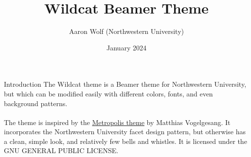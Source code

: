 \documentclass[aspectratio=1610]{beamer}
\title{Wildcat Beamer Theme}
\date{January 2024}
\author{Aaron Wolf (Northwestern University)}
\begin{document}
\begin{frame}
\titlepage
\end{frame}


\begin{frame}{Introduction}
    The Wildcat theme is a Beamer theme for Northwestern University, but which can be modified easily with different colors, fonts, and even background patterns. 
    \\ ~ \\
    The theme is inspired by the \href{https://github.com/matze/mtheme}{Metropolis theme} by Matthias Vogelgesang. It incorporates the Northwestern University facet design pattern, but otherwise has a clean, simple look, and relatively few bells and whistles. It is licensed under the GNU GENERAL PUBLIC LICENSE.
\end{frame}
\end{document}
